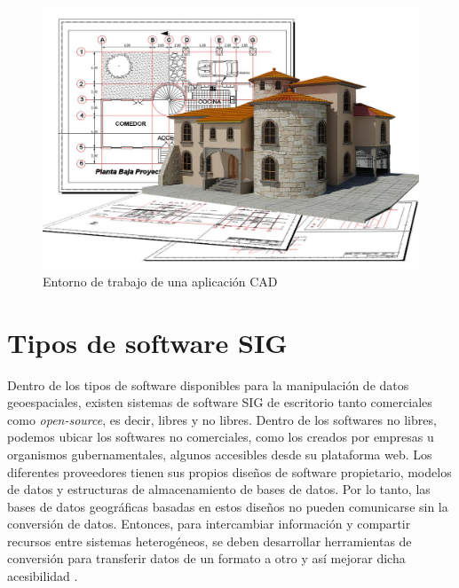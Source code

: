 \begin{figure}[H]
	\centering
	\includegraphics[width=0.75\linewidth]{imagenes/capitulo2/C4nMJdNWcAAoub7}
	\caption{Entorno de trabajo de una aplicación CAD  \cite{sig-cad}}
	\label{fig:c4nmjdnwcaaoub7}
\end{figure}




\section{Tipos de software SIG}

Dentro de los tipos de software disponibles para la manipulación de datos geoespaciales, existen sistemas de software SIG de escritorio tanto comerciales como \textit{open-source}, es decir, libres y no libres. Dentro de los softwares no libres, podemos ubicar los softwares no comerciales, como los creados por empresas u organismos gubernamentales, algunos accesibles desde su plataforma web. Los diferentes proveedores tienen sus propios diseños de software propietario, modelos de datos y estructuras de almacenamiento de bases de datos. Por lo tanto, las bases de datos geográficas basadas en estos diseños no pueden comunicarse sin la conversión de datos. Entonces, para intercambiar información y compartir recursos entre sistemas heterogéneos, se deben desarrollar herramientas de conversión para transferir datos de un formato a otro y así mejorar dicha acesibilidad \cite{libro-gis}. \\



